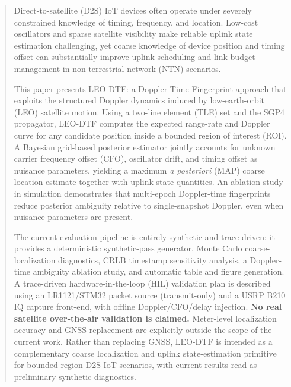 \begin{abstract}
Direct-to-satellite (D2S) IoT devices often operate under severely constrained
knowledge of timing, frequency, and location.  Low-cost oscillators and sparse
satellite visibility make reliable uplink state estimation challenging, yet
coarse knowledge of device position and timing offset can substantially improve
uplink scheduling and link-budget management in non-terrestrial network (NTN)
scenarios.

This paper presents LEO-DTF: a Doppler-Time Fingerprint approach that exploits
the structured Doppler dynamics induced by low-earth-orbit (LEO) satellite
motion.  Using a two-line element (TLE) set and the SGP4 propagator, LEO-DTF
computes the expected range-rate and Doppler curve for any candidate position
inside a bounded region of interest (ROI).  A Bayesian grid-based posterior
estimator jointly accounts for unknown carrier frequency offset (CFO), oscillator
drift, and timing offset as nuisance parameters, yielding a maximum \emph{a posteriori}
(MAP) coarse location estimate together with uplink state quantities.
An ablation study in simulation demonstrates that multi-epoch Doppler-time
fingerprints reduce posterior ambiguity relative to single-snapshot Doppler,
even when nuisance parameters are present.

The current evaluation pipeline is entirely synthetic and trace-driven: it
provides a deterministic synthetic-pass generator, Monte Carlo coarse-localization
diagnostics, CRLB timestamp sensitivity analysis, a Doppler-time ambiguity
ablation study, and automatic table and figure generation.  A trace-driven
hardware-in-the-loop (HIL) validation plan is described using an LR1121/STM32
packet source (transmit-only) and a USRP B210 IQ capture front-end, with
offline Doppler/CFO/delay injection.  \textbf{No real satellite over-the-air
validation is claimed.}  Meter-level localization accuracy and GNSS replacement
are explicitly outside the scope of the current work.  Rather than replacing GNSS,
LEO-DTF is intended as a complementary coarse localization and uplink state-estimation
primitive for bounded-region D2S IoT scenarios, with current results read as
preliminary synthetic diagnostics.
\end{abstract}